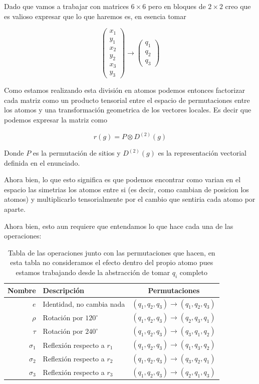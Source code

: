 \documentclass[12pt]{amsart}
\begin{document}
  Dado que vamos a trabajar con matrices $6\times 6$ pero en bloques de $2 \times 2$ creo que es valioso expresar que lo que haremos es, en esencia tomar

  \begin{equation*}
    \begin{pmatrix}
      x_1\\ y_1\\ x_2\\ y_2\\ x_3\\ y_3
    \end{pmatrix} \to
    \begin{pmatrix}
      q_1\\ q_2\\ q_3
    \end{pmatrix}
  \end{equation*}

  Como estamos realizando esta división en atomos podemos entonces factorizar cada matriz como un producto tensorial entre el espacio de permutaciones entre los atomos y una transformación geometrica de los vectores locales. Es decir que podemos expresar la matriz como

  $$r(g) = P\otimes D^{(2)}(g)$$

  Donde $P$ es la permutación de sitios y $D^{(2)}(g)$ es la representación vectorial definida en el enunciado.

  Ahora bien, lo que esto significa es que podemos encontrar como varian en el espacio las simetrias los atomos entre si (es decir, como cambian de posicion los atomos) y multiplicarlo tensorialmente por el cambio que sentiria cada atomo por aparte.

  Ahora bien, esto aun requiere que entendamos lo que hace cada una de las operaciones:
  \begin{table}[h]
    \begin{center}
      \begin{tabular}{ r | l | c }
        \hline
        Nombre & Descripción & Permutaciones\\
        \hline
        $e$ & Identidad, no cambia nada & $(q_1, q_2, q_3) \to (q_1, q_2, q_3)$\\
        $\rho$ & Rotación por $120^{\circ}$ & $(q_1, q_2, q_3) \to (q_2, q_3, q_1)$\\
        $\tau$ & Rotación por $240^{\circ}$ & $(q_1, q_2, q_3) \to (q_3, q_1, q_2)$\\
        $\sigma_1$ & Reflexión respecto a $r_1$ & $(q_1, q_2, q_3) \to (q_1, q_3, q_2)$\\
        $\sigma_2$ & Reflexión respecto a $r_2$ & $(q_1, q_2, q_3) \to (q_3, q_2, q_1)$\\
        $\sigma_3$ & Reflexión respecto a $r_3$ & $(q_1, q_2, q_3) \to (q_2, q_1, q_3)$\\
      \end{tabular}
      \caption{Tabla de las operaciones junto con las permutaciones que hacen, en esta tabla no consideramos el efecto dentro del propio atomo pues estamos trabajando desde la abstracción de tomar $q_i$ completo}
      \label{tab:fruta}
    \end{center}
  \end{table}
\end{document}
